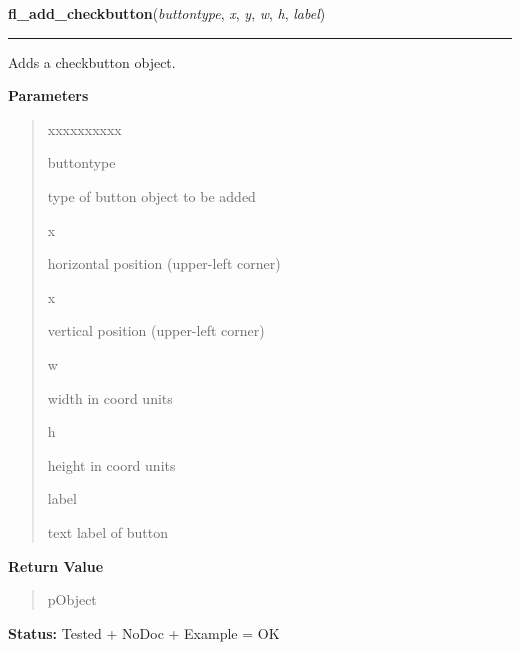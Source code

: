     \label{xformslib:library:fl_add_checkbutton}

    \vspace{0.5ex}

\hspace{.8\funcindent}\begin{boxedminipage}{\funcwidth}

    \raggedright \textbf{fl\_add\_checkbutton}(\textit{buttontype}, \textit{x}, \textit{y}, \textit{w}, \textit{h}, \textit{label})

    \vspace{-1.5ex}

    \rule{\textwidth}{0.5\fboxrule}
\setlength{\parskip}{2ex}
    Adds a checkbutton object.

\setlength{\parskip}{1ex}
      \textbf{Parameters}
      \vspace{-1ex}

      \begin{quote}
        \begin{Ventry}{xxxxxxxxxx}

          \item[buttontype]

          type of button object to be added

          \item[x]

          horizontal position (upper-left corner)

          \item[x]

          vertical position (upper-left corner)

          \item[w]

          width in coord units

          \item[h]

          height in coord units

          \item[label]

          text label of button

        \end{Ventry}

      \end{quote}

      \textbf{Return Value}
    \vspace{-1ex}

      \begin{quote}
      pObject

      \end{quote}

\textbf{Status:} Tested + NoDoc + Example = OK



    \end{boxedminipage}

